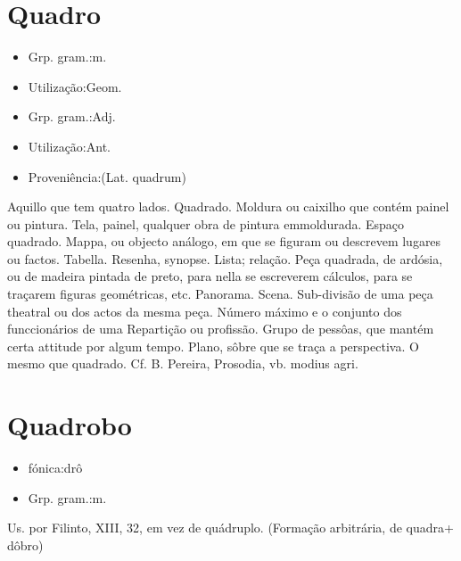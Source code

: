 \section{Quadro}
\begin{itemize}
\item {Grp. gram.:m.}
\end{itemize}
\begin{itemize}
\item {Utilização:Geom.}
\end{itemize}
\begin{itemize}
\item {Grp. gram.:Adj.}
\end{itemize}
\begin{itemize}
\item {Utilização:Ant.}
\end{itemize}
\begin{itemize}
\item {Proveniência:(Lat. \textunderscore quadrum\textunderscore )}
\end{itemize}
Aquillo que tem quatro lados.
Quadrado.
Moldura ou caixilho que contém painel ou pintura.
Tela, painel, qualquer obra de pintura emmoldurada.
Espaço quadrado.
Mappa, ou objecto análogo, em que se figuram ou descrevem lugares ou factos.
Tabella.
Resenha, synopse.
Lista; relação.
Peça quadrada, de ardósia, ou de madeira pintada de preto, para nella se escreverem cálculos, para se traçarem figuras geométricas, etc.
Panorama.
Scena.
Sub-divisão de uma peça theatral ou dos actos da mesma peça.
Número máximo e o conjunto dos funccionários de uma Repartição ou profissão.
Grupo de pessôas, que mantém certa attitude por algum tempo.
Plano, sôbre que se traça a perspectiva.
O mesmo que \textunderscore quadrado\textunderscore . Cf. B. Pereira, \textunderscore Prosodia\textunderscore , vb. \textunderscore modius agri\textunderscore .
\section{Quadrobo}
\begin{itemize}
\item {fónica:drô}
\end{itemize}
\begin{itemize}
\item {Grp. gram.:m.}
\end{itemize}
Us. por Filinto, XIII, 32, em vez de \textunderscore quádruplo\textunderscore .
(Formação arbitrária, de \textunderscore quadra\textunderscore  + \textunderscore dôbro\textunderscore )
